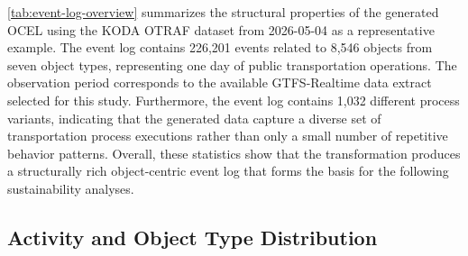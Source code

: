 \autoref{tab:event-log-overview} summarizes the structural properties of the generated OCEL using the KODA OTRAF dataset from 2026-05-04 as a representative example. The event log contains 226,201 events related to 8,546 objects from seven object types, representing one day of public transportation operations. The observation period corresponds to the available GTFS-Realtime data extract selected for this study. Furthermore, the event log contains 1,032 different process variants, indicating that the generated data capture a diverse set of transportation process executions rather than only a small number of repetitive behavior patterns. Overall, these statistics show that the transformation produces a structurally rich object-centric event log that forms the basis for the following sustainability analyses.
\subsection{Activity and Object Type Distribution}

